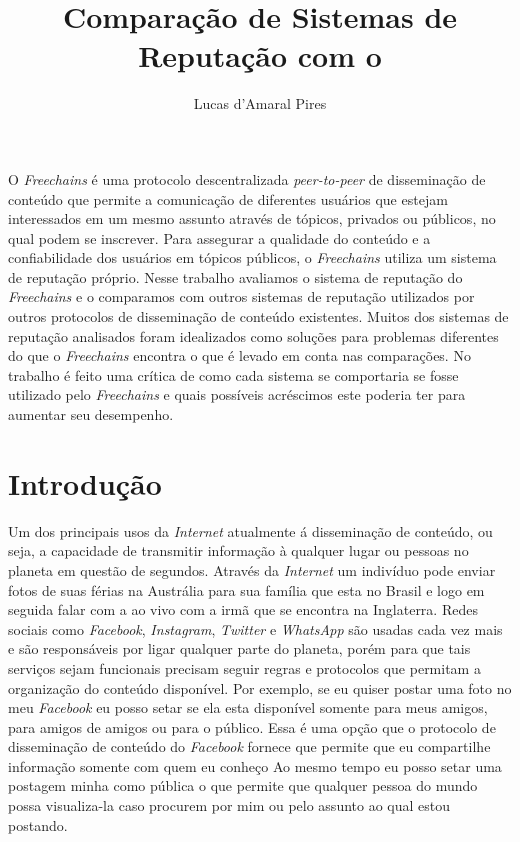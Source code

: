 \documentclass[12pt]{article}
\title{Comparação de Sistemas de Reputação com o \FC}
\author{Lucas d'Amaral Pires\inst{1}}
\newcommand{\FC} {\textit{Freechains}\xspace}
\newcommand{\PtoP} {\textit{peer-to-peer}\xspace}
\begin{document}
 


\maketitle

\begin{resumo} 

O \FC é uma protocolo descentralizada \PtoP de disseminação de conteúdo que permite a comunicação de diferentes usuários que estejam interessados em um mesmo assunto através de tópicos, privados ou públicos, no qual podem se inscrever. 
Para assegurar a qualidade do conteúdo e a confiabilidade dos usuários em tópicos públicos, o \FC utiliza um sistema de reputação próprio.
Nesse trabalho avaliamos o sistema de reputação do \FC e o comparamos com outros sistemas de reputação utilizados por outros protocolos de disseminação de conteúdo existentes.
Muitos dos sistemas de reputação analisados foram idealizados como soluções para problemas diferentes do que o \FC encontra o que é levado em conta nas comparações. 
No trabalho é feito uma crítica de como cada sistema se comportaria se fosse utilizado pelo \FC e quais possíveis acréscimos este poderia ter para aumentar seu desempenho.
  
\end{resumo}


\section{Introdução} \label{sec:intro}

Um dos principais usos da \textit{Internet} atualmente á disseminação de conteúdo, ou seja, a capacidade de transmitir informação à qualquer lugar ou pessoas no planeta em questão de segundos.
Através da \textit{Internet} um indivíduo pode enviar fotos de suas férias na Austrália para sua família que esta no Brasil e logo em seguida falar com a ao vivo com a irmã que se encontra na Inglaterra.
Redes sociais como \textit{Facebook}, \textit{Instagram}, \textit{Twitter} e \textit{WhatsApp} são usadas cada vez mais e são responsáveis por ligar qualquer parte do planeta, porém para que tais serviços sejam funcionais precisam seguir regras e protocolos que permitam a organização do conteúdo disponível.
Por exemplo, se eu quiser postar uma foto no meu \textit{Facebook} eu posso setar se ela esta disponível somente para meus amigos, para amigos de amigos ou para o público. 
Essa é uma opção que o protocolo de disseminação de conteúdo do \textit{Facebook} fornece que permite que  eu compartilhe informação somente com quem eu conheço
Ao mesmo tempo eu posso setar uma postagem minha como pública o que permite que qualquer pessoa do mundo possa visualiza-la caso procurem por mim ou pelo assunto ao qual estou postando.
\end{document}

